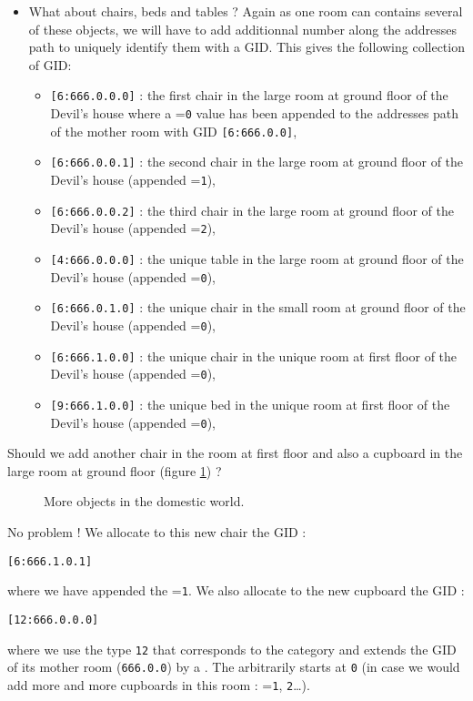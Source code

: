 \begin{itemize}
\item  What about  chairs, beds  and tables  ? Again  as one  room can
  contains several of  these objects, we will have  to add additionnal
  number along  the addresses  path to uniquely  identify them  with a
  GID. This gives the following collection of GID:
\begin{itemize}
\item[] \verb+[6:666.0.0.0]+ : the first chair in the large room at ground floor of the Devil's house
  where a =\texttt{0} value has been appended to the addresses path of the mother
  room with GID \verb+[6:666.0.0]+,
\item[]\verb+[6:666.0.0.1]+ : the second chair in the large room at ground floor of the Devil's house
(appended =\texttt{1}),
\item[]\verb+[6:666.0.0.2]+ : the third chair in the large room at ground floor of the Devil's house
(appended =\texttt{2}),
\item[]\verb+[4:666.0.0.0]+ : the unique table in the large room at ground floor of the Devil's house
(appended =\texttt{0}),
\item[]\verb+[6:666.0.1.0]+ : the unique chair in the small room at ground floor of the Devil's house
(appended =\texttt{0}),
\item[]\verb+[6:666.1.0.0]+ : the unique chair in the unique room at first floor of the Devil's house
(appended =\texttt{0}),
\item[]\verb+[9:666.1.0.0]+ : the unique bed in the unique room at first floor of the Devil's house
(appended =\texttt{0}),
\end{itemize}
\end{itemize}

\pn Should we add  another chair in the room at first  floor and also a cupboard
in the large room at ground floor (figure \ref{fig:house:3}) ?  
\begin{figure}[h]
\begin{center}
\scalebox{1.0}{}
\end{center}
\caption{More objects in the domestic world.}\label{fig:house:3}
\end{figure}
\pn No problem ! We allocate to this  new chair the GID :
\begin{center}
\verb+[6:666.1.0.1]+
\end{center} 
\pn where we have appended the =\texttt{1}. 
We also allocate to the  new cupboard the GID :
\begin{center}
\verb+[12:666.0.0.0]+
\end{center} 
\pn where we use the  type \texttt{12} that corresponds to 
the  category and
extends   the  GID   of  its   mother  room   (\verb+666.0.0+)   by  a
. The  arbitrarily starts  at \texttt{0}  (in  case we
would add more and more cupboards in this room : =\texttt{1}, \texttt{2}\dots).

